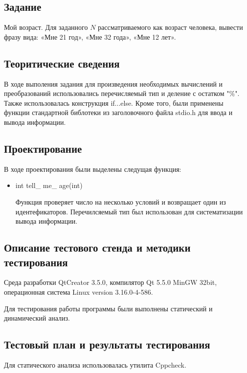 \documentclass[12pt,a4paper]{report}
\begin{document}
\subsection{Задание}

Мой возраст. Для заданного $N$ рассматриваемого как возраст человека, вывести фразу вида: «Мне 21 год», «Мне 32 года», «Мне 12 лет». 

\subsection{Теоритические сведения}

В ходе выполения задания для произведения необходимых вычислений и преобразований использовались перечисляемый тип и деление с остатком "\%". Также использовалась конструкция if...else. Кроме того, были применены функции стандартной библотеки из заголовочного файла stdio.h для ввода и вывода информации.

\subsection{Проектирование}


В ходе проектирования были выделены следущая функция:

\begin{itemize}

	\item int tell\_ me\_ age(int)

	Функция проверяет число на несколько условий и возвращает один из идентефикаторов. Перечилсяемый тип был использован для систематизации вывода информации.
	
\end{itemize}


\subsection{Описание тестового стенда и методики тестирования}
Среда разработки QtCreator 3.5.0, компилятор Qt 5.5.0 MinGW 32bit, операционная система Linux version 3.16.0-4-586.

Для тестирования работы программы были выполнены статический и динамический анализ.

\subsection{Тестовый план и результаты тестирования}

		Для статического анализа использовалась утилита Cppcheck.
		
\end{document}
